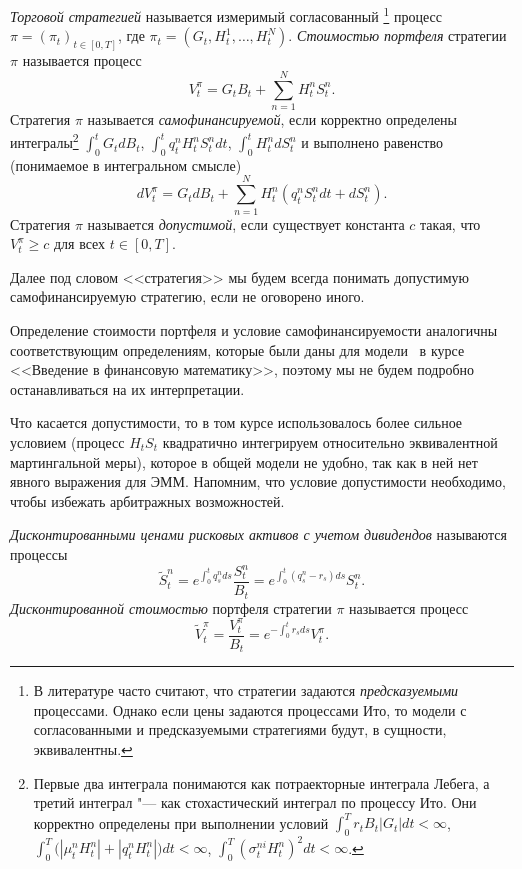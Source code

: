 \begin{definition}
\label{gen:d:strategies}
\emph{Торговой стратегией} называется измеримый согласованный%
\footnote{В литературе часто считают, что стратегии задаются \emph{предсказуемыми} процессами.
Однако если цены задаются процессами Ито, то модели с согласованными и предсказуемыми стратегиями будут, в сущности, эквивалентны.}
процесс $\pi=(\pi_t)_{t\in[0,T]}$, где $\pi_t=(G_t,H_t^1,\dots,H_t^N)$.
\emph{Стоимостью портфеля} стратегии $\pi$ называется процесс
\[
V_t^\pi = G_tB_t + \sum_{n=1}^N H_t^n S_t^n.
\]
Стратегия $\pi$ называется \emph{самофинансируемой}, если корректно определены интегралы\footnote{Первые два интеграла понимаются как потраекторные интеграла Лебега, а третий интеграл "--- как стохастический интеграл по процессу Ито.
Они корректно определены при выполнении условий
$\int_0^T r_t B_t|G_t| dt < \infty$,
$\int_0^T \bigl(|\mu_t^n H_t^n| + |q_t^n H_t^n|\bigr)dt < \infty$,
$\int_0^T (\sigma_t^{ni} H_t^n)^2 dt < \infty$.}
$\int_0^t G_t d B_t$, $\int_0^t q_t^n H_t^n S_t^n dt$, $\int_0^t H_t^n dS_t^n$ и выполнено равенство (понимаемое в интегральном смысле)
\begin{equation}
\label{gen:sf}
d V_t^\pi = G_t d B_t + \sum_{n=1}^N H_t^n (q_t^n S_t^n dt + d S_t^n).
\end{equation}
Стратегия $\pi$ называется \emph{допустимой}, если существует константа $c$ такая, что $V_t^\pi \ge c$ для всех $t\in[0,T]$.
\end{definition}

Далее под словом <<стратегия>> мы будем всегда понимать допустимую самофинансируемую стратегию, если не оговорено иного.

Определение стоимости портфеля и условие самофинансируемости аналогичны соответствующим определениям, которые были даны для модели \bs\ в курсе <<Введение в финансовую математику>>, поэтому мы не будем подробно останавливаться на их интерпретации.

Что касается допустимости, то в том курсе использовалось более сильное условием (процесс $H_tS_t$ квадратично интегрируем относительно эквивалентной мартингальной меры), которое в общей модели не удобно, так как в ней нет явного выражения для ЭММ.
Напомним, что условие допустимости необходимо, чтобы избежать арбитражных возможностей.

\begin{definition}
\emph{Дисконтированными ценами рисковых активов с учетом дивидендов} называются процессы 
\[
\tilde S_t^n = e^{\int_0^t q_s^n ds}\frac{S_t^n}{B_t} = e^{\int_0^t (q_s^n -r_s)ds}S_t^n.
\]
\emph{Дисконтированной стоимостью} портфеля стратегии $\pi$ называется процесс 
\[
\tilde V_t^\pi = \frac{V_t^\pi}{B_t} = e^{-\int_0^t r_sds} V_t^\pi.
\] 
\end{definition}

